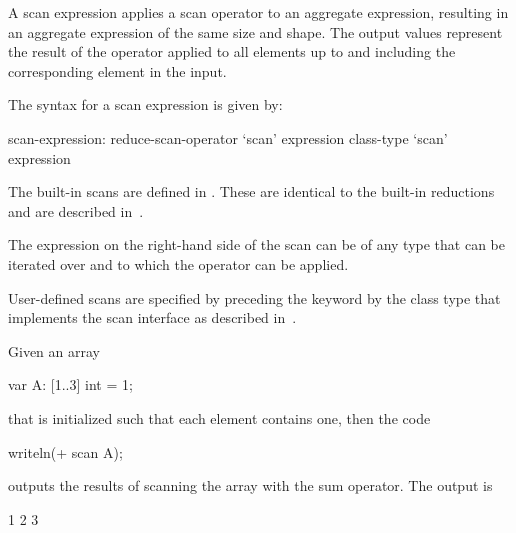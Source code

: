 A scan expression applies a scan operator to an aggregate expression,
resulting in an aggregate expression of the same size and shape.  The
output values represent the result of the operator applied to all
elements up to and including the corresponding element in the input.

The syntax for a scan expression is given by:
\begin{syntax}
scan-expression:
  reduce-scan-operator `scan' expression
  class-type `scan' expression
\end{syntax}

The built-in scans are defined in .  These
are identical to the built-in reductions and are described
in~.

The expression on the right-hand side of the scan can be of any type
that can be iterated over and to which the operator can be applied.

User-defined scans are specified by preceding the keyword 
by the class type that implements the scan interface as described
in~.

\begin{example}
Given an array
\begin{chapel}
var A: [1..3] int = 1;
\end{chapel}
that is initialized such that each element contains one, then the code
\begin{chapel}
writeln(+ scan A);
\end{chapel}
outputs the results of scanning the array with the sum operator.  The
output is
\begin{chapel}
1 2 3
\end{chapel}
\end{example}
